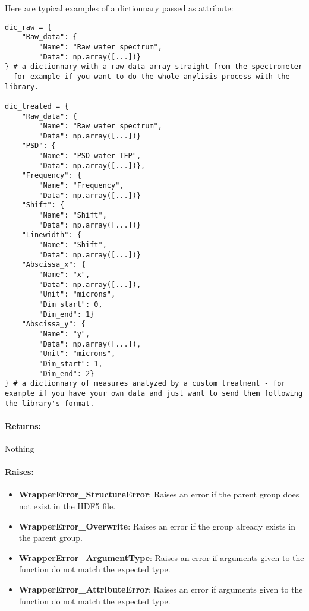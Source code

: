 Here are typical examples of a dictionnary passed as attribute:
\begin{lstlisting}
dic_raw = {
    "Raw_data": {
        "Name": "Raw water spectrum", 
        "Data": np.array([...])}
} # a dictionnary with a raw data array straight from the spectrometer - for example if you want to do the whole anylisis process with the library.

dic_treated = {
    "Raw_data": {
        "Name": "Raw water spectrum", 
        "Data": np.array([...])}
    "PSD": {
        "Name": "PSD water TFP", 
        "Data": np.array([...])},
    "Frequency": {
        "Name": "Frequency", 
        "Data": np.array([...])}
    "Shift": {
        "Name": "Shift", 
        "Data": np.array([...])}
    "Linewidth": {
        "Name": "Shift", 
        "Data": np.array([...])}
    "Abscissa_x": {
        "Name": "x", 
        "Data": np.array([...]),
        "Unit": "microns",
        "Dim_start": 0,
        "Dim_end": 1}
    "Abscissa_y": {
        "Name": "y", 
        "Data": np.array([...]),
        "Unit": "microns",
        "Dim_start": 1,
        "Dim_end": 2}
} # a dictionnary of measures analyzed by a custom treatment - for example if you have your own data and just want to send them following the library's format.
\end{lstlisting}

\paragraph{Returns:} Nothing

\paragraph{Raises:}

\begin{itemize}
    \item \textbf{WrapperError\_StructureError}: Raises an error if the parent group does not exist in the HDF5 file.
    \item \textbf{WrapperError\_Overwrite}: Raises an error if the group already exists in the parent group.
    \item \textbf{WrapperError\_ArgumentType}: Raises an error if arguments given to the function do not match the expected type.
    \item \textbf{WrapperError\_AttributeError}: Raises an error if arguments given to the function do not match the expected type.
\end{itemize}

